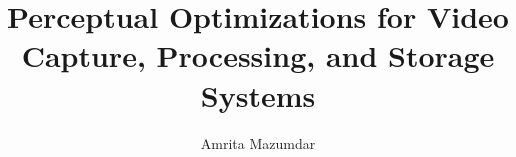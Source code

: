 \documentclass[nobib,notoc]{tufte-book}
\title{Perceptual Optimizations for Video Capture, Processing, and Storage Systems}
\author[Amrita Mazumdar]{Amrita Mazumdar}
\begin{document}
\frontmatter







\blankpage



\blankpage



\blankpage


\tableofcontents

\cleardoublepage

\mainmatter


\cleardoublepage




\cleardoublepage





\backmatter



\printindex
\end{document}
